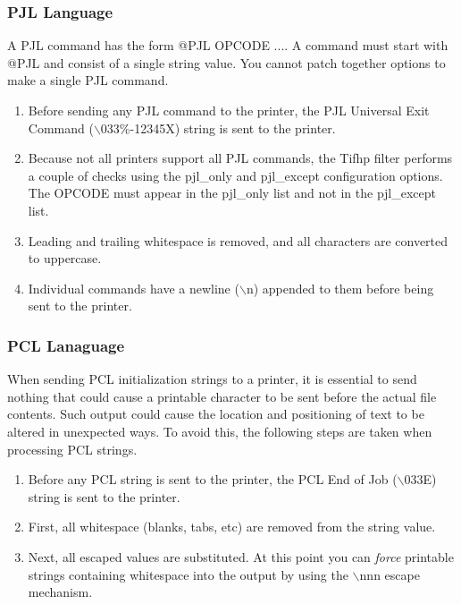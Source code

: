 \documentclass[a4paper]{article}
\begin{document}
\subsubsection{PJL Language}

A PJL command has the form
{\ttfamily @PJL OPCODE ...}.
A command must start with
{\ttfamily @PJL}
and consist of a single string value.
You cannot patch together options to make a single PJL command.
\begin{enumerate}
\item Before sending any PJL command to the printer,
the PJL Universal Exit Command
({\ttfamily $\backslash$033\%-12345X})
string is sent to the printer.
\item Because not all printers support all PJL commands,
the Tifhp filter performs a couple of checks using the
{\ttfamily pjl\_only}
and
{\ttfamily pjl\_except}
configuration options.
The OPCODE must appear in the
{\ttfamily pjl\_only}
list and not in the
{\ttfamily pjl\_except}
list.
\item Leading and trailing whitespace is removed,
and all characters are converted to uppercase.
\item Individual commands have a newline
({\ttfamily $\backslash$n}) appended to them before being sent to the printer.
\end{enumerate}



\subsubsection{PCL Lanaguage}

When sending PCL initialization strings to a printer,
it is essential to send nothing that could cause a printable character to
be sent before the actual file contents.
Such output could cause the location and positioning of text to be altered
in unexpected ways.
To avoid this,
the following steps are taken when processing PCL strings.
\begin{enumerate}
\item Before any PCL string is sent to the printer,
the PCL End of Job
({\ttfamily $\backslash$033E}) string is sent to the printer.
\item First,
all whitespace (blanks, tabs, etc) are removed from the string value.
\item Next, all escaped values are substituted.
At this point you can
{\itshape force\/}
printable strings containing whitespace into the output by using the
{\ttfamily $\backslash$nnn}
escape mechanism.
\end{enumerate}
\end{document}
